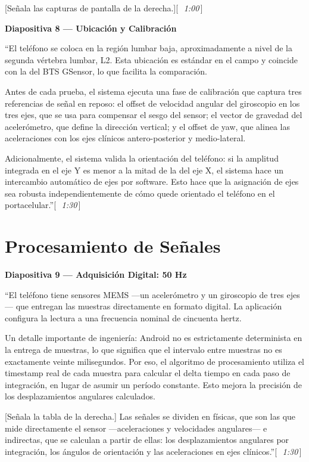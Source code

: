 \documentclass[12pt]{article}
\newcommand{\diap}[2]{%
  \begin{slidebox}
    \textbf{\color{slateblue}Diapositiva #1 — #2}
  \end{slidebox}%
}
\newcommand{\tiempo}[1]{\hfill{\small\color{timebox}[\,\textit{~#1}\,]}}
\begin{document}
[Señala las capturas de pantalla de la derecha.]\tiempo{1:00}

\diap{8}{Ubicación y Calibración}

``El teléfono se coloca en la región lumbar baja, aproximadamente a nivel de la segunda vértebra lumbar, L2. Esta ubicación es estándar en el campo y coincide con la del BTS GSensor, lo que facilita la comparación.

Antes de cada prueba, el sistema ejecuta una fase de calibración que captura tres referencias de señal en reposo: el offset de velocidad angular del giroscopio en los tres ejes, que se usa para compensar el sesgo del sensor; el vector de gravedad del acelerómetro, que define la dirección vertical; y el offset de yaw, que alinea las aceleraciones con los ejes clínicos antero-posterior y medio-lateral.

Adicionalmente, el sistema valida la orientación del teléfono: si la amplitud integrada en el eje Y es menor a la mitad de la del eje X, el sistema hace un intercambio automático de ejes por software. Esto hace que la asignación de ejes sea robusta independientemente de cómo quede orientado el teléfono en el portacelular.''\tiempo{1:30}

\section{Procesamiento de Señales}

\diap{9}{Adquisición Digital: 50 Hz}

``El teléfono tiene sensores MEMS —un acelerómetro y un giroscopio de tres ejes— que entregan las muestras directamente en formato digital. La aplicación configura la lectura a una frecuencia nominal de cincuenta hertz.

Un detalle importante de ingeniería: Android no es estrictamente determinista en la entrega de muestras, lo que significa que el intervalo entre muestras no es exactamente veinte milisegundos. Por eso, el algoritmo de procesamiento utiliza el timestamp real de cada muestra para calcular el delta tiempo en cada paso de integración, en lugar de asumir un período constante. Esto mejora la precisión de los desplazamientos angulares calculados.

[Señala la tabla de la derecha.] Las señales se dividen en físicas, que son las que mide directamente el sensor —aceleraciones y velocidades angulares— e indirectas, que se calculan a partir de ellas: los desplazamientos angulares por integración, los ángulos de orientación y las aceleraciones en ejes clínicos.''\tiempo{1:30}
\end{document}
